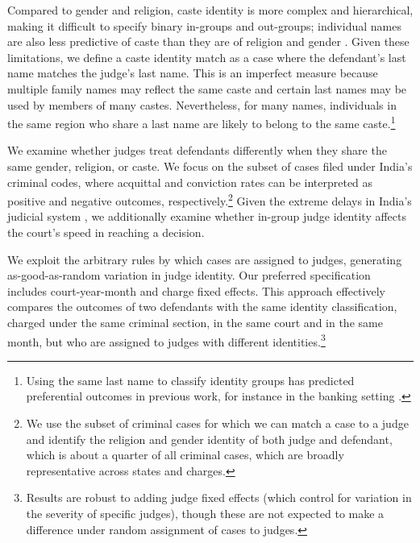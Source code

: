 \documentclass[12pt,english]{article}
\begin{document}
Compared to gender and religion, caste identity is more complex and hierarchical, making it difficult to specify binary in-groups and out-groups; individual names are also less predictive of caste than they are of religion and gender \citep{vahini2022}. Given these limitations, we define a caste identity match as a case where the defendant's last name matches the judge's last name. This is an imperfect measure because multiple family names may reflect the same caste and certain last names may be used by members of many castes. Nevertheless, for many names, individuals in the same region who share a last name are likely to belong to the same caste.\footnote{Using the same last name to classify identity groups has predicted preferential outcomes in previous work, for instance in the banking setting \citep{fisman2017cultural}.}

We examine whether judges treat defendants differently when they share the same gender, religion, or caste.  We focus on the subset of cases filed under India's criminal codes, where acquittal and conviction rates can be interpreted as positive and negative outcomes, respectively.\footnote{We use the subset of criminal cases for which we can match a case to a judge and identify the religion and gender identity of both judge and defendant, which is about a quarter of all criminal cases, which are broadly representative across states and charges.} Given the extreme delays in India's judicial system \citep{trusts2019india, rao2019judges}, we additionally examine whether in-group judge identity affects the court's speed in reaching a decision.

We exploit the arbitrary rules by which cases are assigned to judges, generating as-good-as-random variation in judge identity. Our preferred specification includes court-year-month and charge fixed effects. This approach effectively compares the outcomes of two defendants with the same identity classification, charged under the same criminal section, in the same court and in the same month, but who are assigned to judges with different identities.\footnote{Results are robust to adding judge fixed effects (which control for variation in the severity of specific judges), though these are not expected to make a difference under random assignment of cases to judges.}
\end{document}
